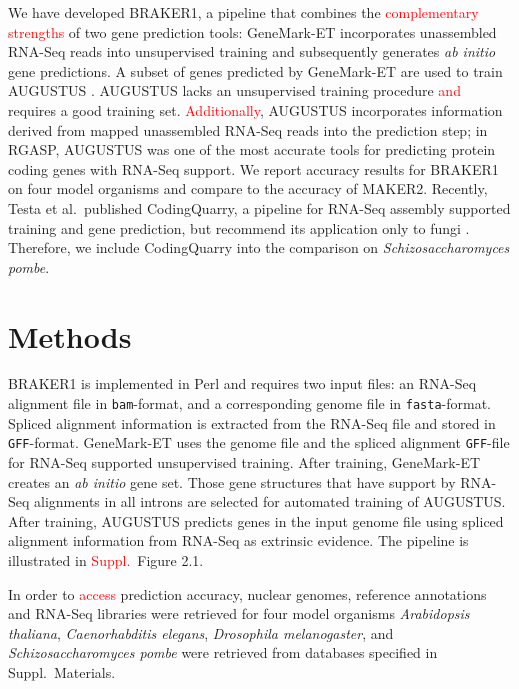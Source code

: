 \documentclass[a4paper,10pt]{article}
\begin{document}
We have developed BRAKER1, a pipeline that combines the \textcolor{red}{complementary strengths} of two gene prediction tools: GeneMark-ET \citep{GeneMark-ET} incorporates unassembled RNA-Seq reads into unsupervised training and subsequently generates \textit{ab initio} gene predictions. A subset of genes predicted by GeneMark-ET are used to train AUGUSTUS \citep{AUGUSTUS}. AUGUSTUS lacks an unsupervised training procedure \textcolor{red}{and} requires a good training set. \textcolor{red}{Additionally}, AUGUSTUS incorporates information derived from mapped unassembled RNA-Seq reads into the prediction step; in RGASP, AUGUSTUS was one of the most accurate tools for predicting protein coding genes with RNA-Seq support. We report accuracy results for BRAKER1 on four model organisms and compare to the accuracy of MAKER2. Recently, Testa et al.~published CodingQuarry, a pipeline for RNA-Seq assembly supported training and gene prediction, but recommend its application only to fungi \citep{CodingQuarry}. Therefore, we 
include CodingQuarry into the comparison on \textit{Schizosaccharomyces pombe}.



\section{Methods}

BRAKER1 is implemented in Perl and requires two input files: an RNA-Seq alignment file in \texttt{bam}-format, and a corresponding genome file in \texttt{fasta}-format. Spliced alignment information is extracted from the RNA-Seq file and stored in \texttt{GFF}-format. GeneMark-ET uses the genome file and  the spliced alignment \texttt{GFF}-file for RNA-Seq supported unsupervised training. After training, GeneMark-ET creates an \textit{ab initio} gene set. Those gene structures that have support by RNA-Seq alignments in all introns are selected for automated training of AUGUSTUS. After training, AUGUSTUS predicts genes in the input genome file using spliced alignment information from RNA-Seq as extrinsic evidence. The pipeline is illustrated in \textcolor{red}{Suppl.~}Figure 2.1.




In order to \textcolor{red}{access} prediction accuracy, nuclear genomes, reference annotations and RNA-Seq libraries were retrieved for four model organisms \textit{Arabidopsis thaliana}, \textit{Caenorhabditis elegans}, \textit{Drosophila melanogaster}, and \textit{Schizosaccharomyces pombe} were retrieved from databases specified in Suppl.~Materials.
\end{document}
